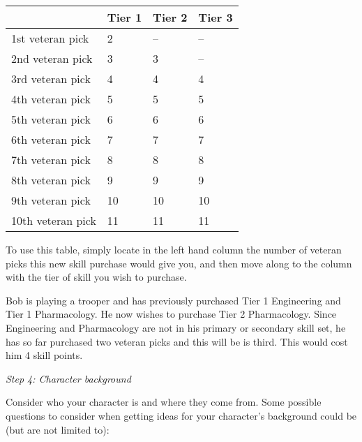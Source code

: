 \documentclass{scrbook}
\begin{document}
\begin{table}
\begin{tabular}{|l|l|l|l|} \hline 
 & Tier 1 & Tier 2 & Tier 3 \\
 \hline 1st veteran pick & 2 & -- & -- \\
 \hline 2nd veteran pick & 3 & 3 & -- \\
 \hline 3rd veteran pick & 4 & 4 & 4 \\
 \hline 4th veteran pick & 5 & 5 & 5 \\
 \hline 5th veteran pick & 6 & 6 & 6 \\
 \hline 6th veteran pick & 7 & 7 & 7 \\
 \hline 7th veteran pick & 8 & 8 & 8 \\
 \hline 8th veteran pick & 9 & 9 & 9 \\
 \hline 9th veteran pick & 10 & 10 & 10 \\
 \hline 10th veteran pick & 11 & 11 & 11 \\
 \hline \end{tabular}

\end{table}

To use this table, simply locate in the left hand column the number of veteran picks this new skill purchase would give you, and then move along to the column with the tier of skill you wish to purchase.

Bob is playing a trooper and has previously purchased Tier 1 Engineering and Tier 1 Pharmacology. He now wishes to purchase Tier 2 Pharmacology. Since Engineering and Pharmacology are not in his primary or secondary skill set, he has so far purchased two veteran picks and this will be is third. This would cost him 4 skill points.

\textit{Step 4: Character background}

Consider who your character is and where they come from. Some possible questions to consider when getting ideas for your character's background could be (but are not limited to):
\end{document}
